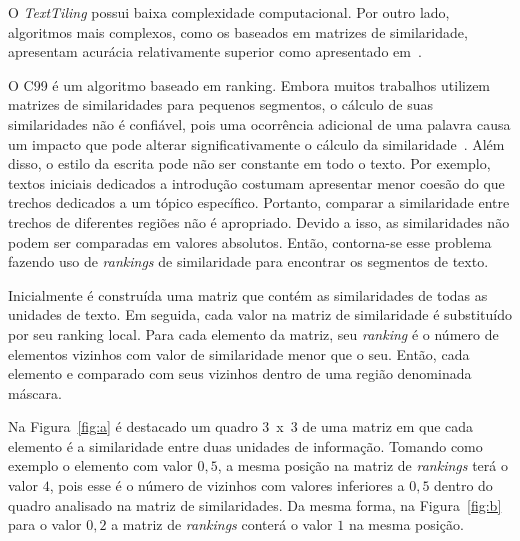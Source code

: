 

O \textit{TextTiling} possui baixa complexidade computacional. Por outro lado, algoritmos mais complexos, como os baseados em matrizes de similaridade, apresentam acurácia relativamente superior como apresentado em~\cite{Choi2000, Kern2009, Misra2009}.


O C99 é um algoritmo baseado em ranking.
%
Embora muitos trabalhos utilizem matrizes de similaridades para pequenos segmentos, o cálculo de suas similaridades não é confiável, pois uma ocorrência adicional de uma palavra causa um impacto que pode alterar significativamente o cálculo da similaridade~\cite{Choi2000}.
%
Além disso, o estilo da escrita pode não ser constante em todo o texto. Por exemplo, textos iniciais dedicados a introdução costumam apresentar menor coesão do que trechos dedicados a um tópico específico. Portanto, comparar a similaridade entre trechos de diferentes regiões não é apropriado.
Devido a isso, as similaridades não podem ser comparadas em valores absolutos. Então, contorna-se esse problema fazendo uso de \textit{rankings} de similaridade para encontrar os segmentos de texto. 


Inicialmente é construída uma matriz que contém as similaridades de todas as unidades de texto. Em seguida, cada valor na matriz de similaridade é substituído por seu ranking local. Para cada elemento da matriz, seu \textit{ranking} é o número de elementos vizinhos com valor de similaridade menor que o seu.
Então, cada elemento e comparado com seus vizinhos dentro de uma região denominada máscara.
%

Na Figura~\ref{fig:a} é destacado um quadro 3~x~3 de uma matriz em que cada elemento é a similaridade entre duas unidades de informação. 
%
Tomando como exemplo o elemento com valor $0,5$, a mesma posição na matriz de \textit{rankings} terá o valor $4$, pois esse é o número de vizinhos com valores inferiores a $0,5$ dentro do quadro analisado na matriz de similaridades. Da mesma forma, na Figura~\ref{fig:b} para o valor $0,2$ a matriz de \textit{rankings} conterá o valor $1$ na mesma posição.









